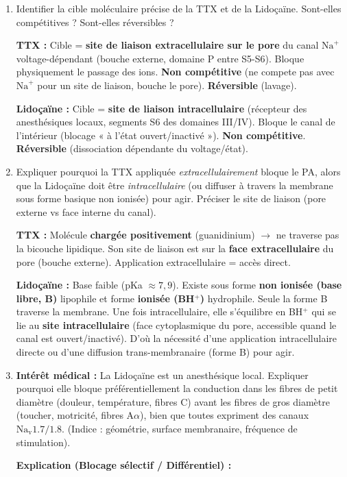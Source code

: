 \documentclass[11pt]{article}
\begin{document}
\begin{exercice}
\begin{enumerate}
\item Identifier la cible moléculaire précise de la TTX et de la Lidoçaïne. Sont-elles compétitives ? Sont-elles réversibles ?
\par \textbf{TTX :} Cible = \textbf{site de liaison extracellulaire sur le pore} du canal $\text{Na}^+$ voltage-dépendant (bouche externe, domaine P entre S5-S6). Bloque physiquement le passage des ions. \textbf{Non compétitive} (ne compete pas avec $\text{Na}^+$ pour un site de liaison, bouche le pore). \textbf{Réversible} (lavage).
\par \textbf{Lidoçaïne :} Cible = \textbf{site de liaison intracellulaire} (récepteur des anesthésiques locaux, segments S6 des domaines III/IV). Bloque le canal de l'intérieur (blocage « à l'état ouvert/inactivé »). \textbf{Non compétitive}. \textbf{Réversible} (dissociation dépendante du voltage/état).
\item Expliquer pourquoi la TTX appliquée \emph{extracellulairement} bloque le PA, alors que la Lidoçaïne doit être \emph{intracellulaire} (ou diffuser à travers la membrane sous forme basique non ionisée) pour agir. Préciser le site de liaison (pore externe vs face interne du canal).
\par \textbf{TTX :} Molécule \textbf{chargée positivement} (guanidinium) $\to$ ne traverse pas la bicouche lipidique. Son site de liaison est sur la \textbf{face extracellulaire} du pore (bouche externe). Application extracellulaire = accès direct.
\par \textbf{Lidoçaïne :} Base faible (pKa $\approx 7,9$). Existe sous forme \textbf{non ionisée (base libre, B)} lipophile et forme \textbf{ionisée (BH$^+$)} hydrophile. Seule la forme B traverse la membrane. Une fois intracellulaire, elle s'équilibre en BH$^+$ qui se lie au \textbf{site intracellulaire} (face cytoplasmique du pore, accessible quand le canal est ouvert/inactivé). D'où la nécessité d'une application intracellulaire directe ou d'une diffusion trans-membranaire (forme B) pour agir.
\item \textbf{Intérêt médical :} La Lidoçaïne est un anesthésique local. Expliquer pourquoi elle bloque préférentiellement la conduction dans les fibres de petit diamètre (douleur, température, fibres C) avant les fibres de gros diamètre (toucher, motricité, fibres A$\alpha$), bien que toutes expriment des canaux $\text{Na}_{\text{v}}1.7/1.8$. (Indice : géométrie, surface membranaire, fréquence de stimulation).
\par \textbf{Explication (Blocage sélectif / Différentiel) :}

\end{enumerate}
\end{exercice}
\end{document}
